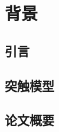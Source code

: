 \chapter{背景}
\label{chapter:background}

\section{引言}
\label{section:background-introduction}

\section{突触模型}
\label{section:background-synapse-model}

\section{论文概要}
\label{section:background-outline}
